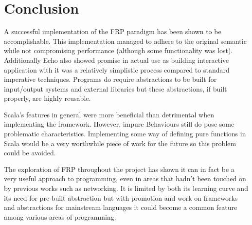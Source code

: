\chapter{Conclusion}

A successful implementation of the FRP paradigm has been shown to be accomplishable. This implementation
managed to adhere to the original semantic while not compromising performance (although some functionality was
lost). Additionally Echo also showed promise in actual use as building interactive application with it
was a relatively simplistic process compared to standard imperative techniques. Programs do require abstractions
to be built for input/output systems and external libraries but these abstractions, if built properly, are highly
reusable.

Scala's features in general were more beneficial than detrimental when implementing the framework. However,
impure Behaviours still do pose some problematic characteristics. Implementing some way of defining pure functions
in Scala would be a very worthwhile piece of work for the future so this problem could be avoided.

The exploration of FRP throughout the project has shown it can in fact be a very useful approach to programming,
even in areas that hadn't been touched on by previous works such as networking. It is limited by
both its learning curve and its need for pre-built abstraction but with promotion and work on frameworks
and abstractions for mainstream languages it could become a common feature among various areas of programming.